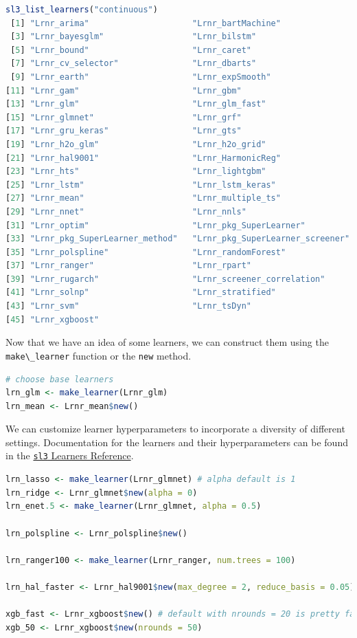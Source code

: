 \documentclass[12pt, krantz2,]{krantz}
\newcommand{\passthrough}[1]{#1}
\theoremstyle{definition}
\theoremstyle{definition}
\theoremstyle{definition}
\newcommand{\1}{\mathbbm{1}}
\begin{document}
\begin{lstlisting}[language=R]
sl3_list_learners("continuous")
 [1] "Lrnr_arima"                     "Lrnr_bartMachine"              
 [3] "Lrnr_bayesglm"                  "Lrnr_bilstm"                   
 [5] "Lrnr_bound"                     "Lrnr_caret"                    
 [7] "Lrnr_cv_selector"               "Lrnr_dbarts"                   
 [9] "Lrnr_earth"                     "Lrnr_expSmooth"                
[11] "Lrnr_gam"                       "Lrnr_gbm"                      
[13] "Lrnr_glm"                       "Lrnr_glm_fast"                 
[15] "Lrnr_glmnet"                    "Lrnr_grf"                      
[17] "Lrnr_gru_keras"                 "Lrnr_gts"                      
[19] "Lrnr_h2o_glm"                   "Lrnr_h2o_grid"                 
[21] "Lrnr_hal9001"                   "Lrnr_HarmonicReg"              
[23] "Lrnr_hts"                       "Lrnr_lightgbm"                 
[25] "Lrnr_lstm"                      "Lrnr_lstm_keras"               
[27] "Lrnr_mean"                      "Lrnr_multiple_ts"              
[29] "Lrnr_nnet"                      "Lrnr_nnls"                     
[31] "Lrnr_optim"                     "Lrnr_pkg_SuperLearner"         
[33] "Lrnr_pkg_SuperLearner_method"   "Lrnr_pkg_SuperLearner_screener"
[35] "Lrnr_polspline"                 "Lrnr_randomForest"             
[37] "Lrnr_ranger"                    "Lrnr_rpart"                    
[39] "Lrnr_rugarch"                   "Lrnr_screener_correlation"     
[41] "Lrnr_solnp"                     "Lrnr_stratified"               
[43] "Lrnr_svm"                       "Lrnr_tsDyn"                    
[45] "Lrnr_xgboost"                  
\end{lstlisting}

Now that we have an idea of some learners, we can construct them using the
\passthrough{\lstinline!make\_learner!} function or the \passthrough{\lstinline!new!} method.

\begin{lstlisting}[language=R]
# choose base learners
lrn_glm <- make_learner(Lrnr_glm)
lrn_mean <- Lrnr_mean$new()
\end{lstlisting}

We can customize learner hyperparameters to incorporate a diversity of
different settings. Documentation for the learners and their hyperparameters
can be found in the \href{https://tlverse.org/sl3/reference/index.html\#section-sl-learners}{\passthrough{\lstinline!sl3!} Learners
Reference}.

\begin{lstlisting}[language=R]
lrn_lasso <- make_learner(Lrnr_glmnet) # alpha default is 1
lrn_ridge <- Lrnr_glmnet$new(alpha = 0)
lrn_enet.5 <- make_learner(Lrnr_glmnet, alpha = 0.5)

lrn_polspline <- Lrnr_polspline$new()

lrn_ranger100 <- make_learner(Lrnr_ranger, num.trees = 100)

lrn_hal_faster <- Lrnr_hal9001$new(max_degree = 2, reduce_basis = 0.05)

xgb_fast <- Lrnr_xgboost$new() # default with nrounds = 20 is pretty fast
xgb_50 <- Lrnr_xgboost$new(nrounds = 50)
\end{lstlisting}
\end{document}
